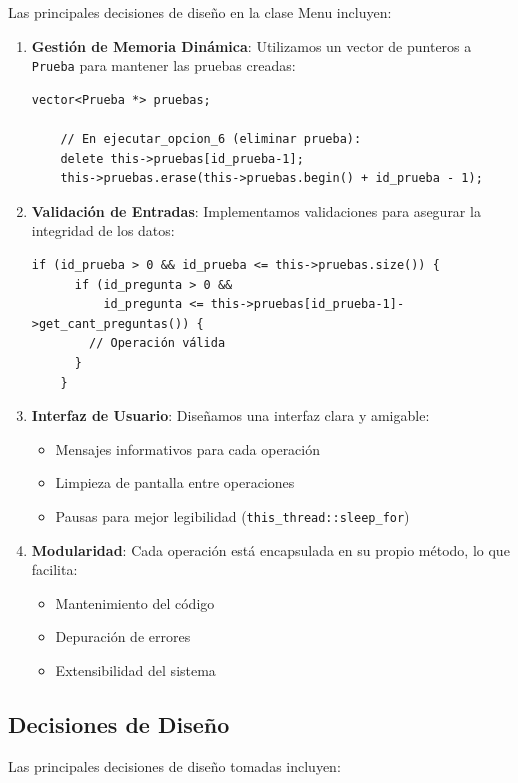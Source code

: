 \documentclass[12pt]{article}
\begin{document}
Las principales decisiones de dise\~no en la clase Menu incluyen:

\begin{enumerate}
    \item \textbf{Gesti\'on de Memoria Din\'amica}: Utilizamos un vector de punteros a \texttt{Prueba} para mantener las pruebas creadas:
    \begin{lstlisting}[style=customc]
    vector<Prueba *> pruebas;
    
    // En ejecutar_opcion_6 (eliminar prueba):
    delete this->pruebas[id_prueba-1];
    this->pruebas.erase(this->pruebas.begin() + id_prueba - 1);
    \end{lstlisting}

    \item \textbf{Validaci\'on de Entradas}: Implementamos validaciones para asegurar la integridad de los datos:
    \begin{lstlisting}[style=customc]
    if (id_prueba > 0 && id_prueba <= this->pruebas.size()) {
      if (id_pregunta > 0 && 
          id_pregunta <= this->pruebas[id_prueba-1]->get_cant_preguntas()) {
        // Operación válida
      }
    }
    \end{lstlisting}

    \item \textbf{Interfaz de Usuario}: Dise\~namos una interfaz clara y amigable:
    \begin{itemize}
        \item Mensajes informativos para cada operaci\'on
        \item Limpieza de pantalla entre operaciones
        \item Pausas para mejor legibilidad (\texttt{this\_thread::sleep\_for})
    \end{itemize}

    \item \textbf{Modularidad}: Cada operaci\'on est\'a encapsulada en su propio m\'etodo, lo que facilita:
    \begin{itemize}
        \item Mantenimiento del c\'odigo
        \item Depuraci\'on de errores
        \item Extensibilidad del sistema
    \end{itemize}
\end{enumerate}

\subsection{Decisiones de Dise\~no}
Las principales decisiones de dise\~no tomadas incluyen:
\end{document}
